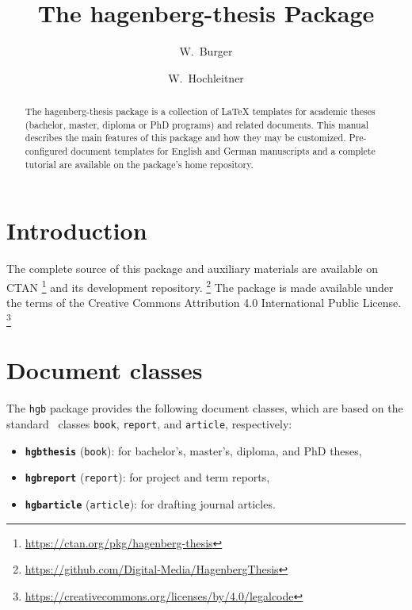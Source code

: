 \documentclass[english]{hgbarticle}
\begin{document}

\title{The \textsf{hagenberg-thesis} Package}
\date{\hgbDate}

\author{W.\ Burger}
\author{W.\ Hochleitner}

\maketitle

\begin{abstract}\noindent
The \textsf{hagenberg-thesis} package is a collection of LaTeX
templates for academic theses (bachelor, master, diploma or PhD programs) and
related documents. This manual describes the main features of this package
and how they may be customized.
Pre-configured document templates for English and German manuscripts and a
complete tutorial are available on the package's home repository.
\end{abstract}

\clearpage
\tableofcontents
\clearpage

\section{Introduction}

\makeatletter
\AB@authors
\makeatother

The complete source of this package and auxiliary materials are available on
CTAN%
\footnote{\url{https://ctan.org/pkg/hagenberg-thesis}}
and its development repository.%
\footnote{\url{https://github.com/Digital-Media/HagenbergThesis}}
The package is made available under the terms of the Creative Commons
Attribution 4.0 International Public License.%
\footnote{\url{https://creativecommons.org/licenses/by/4.0/legalcode}}


\section{Document classes}

The \texttt{hgb} package provides the following document classes, which are
based on the standard \latex\ classes \texttt{book}, \texttt{report}, and
\texttt{article}, respectively:
%
\begin{itemize}
    \item \textbf{\texttt{hgbthesis}} (\texttt{book}):
    for bachelor's, master's, diploma, and PhD theses,
    \item \textbf{\texttt{hgbreport}} (\texttt{report}):
    for project and term reports,
    \item \textbf{\texttt{hgbarticle}} (\texttt{article}):
    for drafting journal articles.
\end{itemize}
\end{document}
